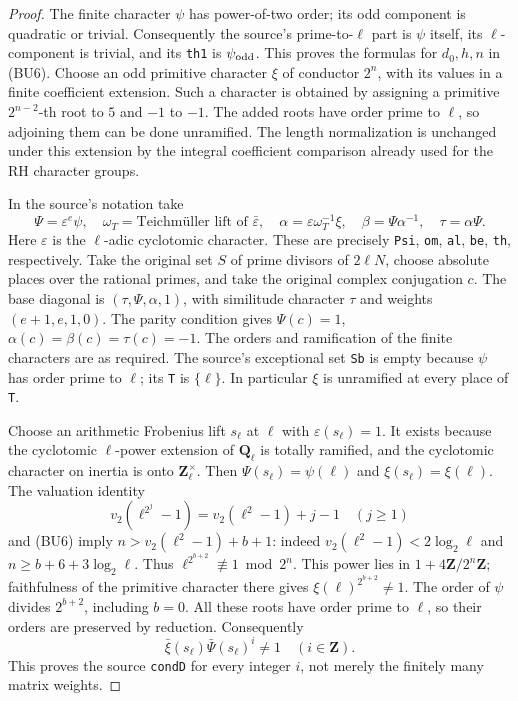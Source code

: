 \begin{proof}
The finite character $\psi$ has power-of-two order;
its odd component is quadratic or trivial. Consequently
the source's prime-to-$\ell$ part is $\psi$ itself,
its $\ell$-component is trivial, and its \texttt{th1}
is $\psi_{\rm odd}$. This proves the formulas for
$d_0,h,n$ in (BU6). Choose an odd primitive character
$\xi$ of conductor $2^n$, with its values in a finite
coefficient extension. Such a character is obtained
by assigning a primitive $2^{n-2}$-th root to $5$ and
$-1$ to $-1$. The added roots have order prime to
$\ell$, so adjoining them can be done unramified.
The length normalization is unchanged under this
extension by the integral coefficient comparison
already used for the RH character groups.

In the source's notation take
\[
 \Psi=\varepsilon^e\psi,\quad
 \omega_T=\text{Teichm\"uller lift of }\bar\varepsilon,\quad
 \alpha=\varepsilon\omega_T^{-1}\xi,\quad
 \beta=\Psi\alpha^{-1},\quad \tau=\alpha\Psi .
\]
Here $\varepsilon$ is the $\ell$-adic cyclotomic character.
These are precisely \texttt{Psi}, \texttt{om},
\texttt{al}, \texttt{be}, \texttt{th}, respectively.
Take the original set $S$ of prime divisors of
$2\ell N$, choose absolute places over the rational
primes, and take the original complex conjugation $c$.
The base diagonal is $(\tau,\Psi,\alpha,1)$, with
similitude character $\tau$ and weights $(e+1,e,1,0)$.
The parity condition gives $\Psi(c)=1$,
$\alpha(c)=\beta(c)=\tau(c)=-1$.
The orders and ramification of the finite characters
are as required. The source's exceptional set
\texttt{Sb} is empty because $\psi$ has order prime
to $\ell$; its \texttt{T} is $\{\ell\}$.
In particular $\xi$ is unramified at every place of
\texttt{T}.

Choose an arithmetic Frobenius lift $s_\ell$ at $\ell$
with $\varepsilon(s_\ell)=1$. It exists because the
cyclotomic $\ell$-power extension of $\mathbf Q_\ell$
is totally ramified, and the cyclotomic character on
inertia is onto $\mathbf Z_\ell^\times$. Then
$\Psi(s_\ell)=\psi(\ell)$ and $\xi(s_\ell)=\xi(\ell)$.
The valuation identity
\[
 v_2(\ell^{2^j}-1)=v_2(\ell^2-1)+j-1
                   \quad(j\ge1)
\]
and (BU6) imply
$n>v_2(\ell^2-1)+b+1$: indeed
$v_2(\ell^2-1)<2\log_2\ell$ and
$n\ge b+6+3\log_2\ell$.
Thus $\ell^{2^{b+2}}\not\equiv1\bmod2^n$.
This power lies in $1+4\mathbf Z/2^n\mathbf Z$;
faithfulness of the primitive character there gives
$\xi(\ell)^{2^{b+2}}\ne1$.
The order of $\psi$ divides $2^{b+2}$, including
$b=0$. All these roots have order prime to $\ell$,
so their orders are preserved by reduction.
Consequently
\[
       \bar\xi(s_\ell)\bar\Psi(s_\ell)^i\ne1
                         \quad(i\in\mathbf Z).                 \tag{BU8}
\]
This proves the source \texttt{condD} for every
integer $i$, not merely the finitely many matrix weights.


\end{proof}
